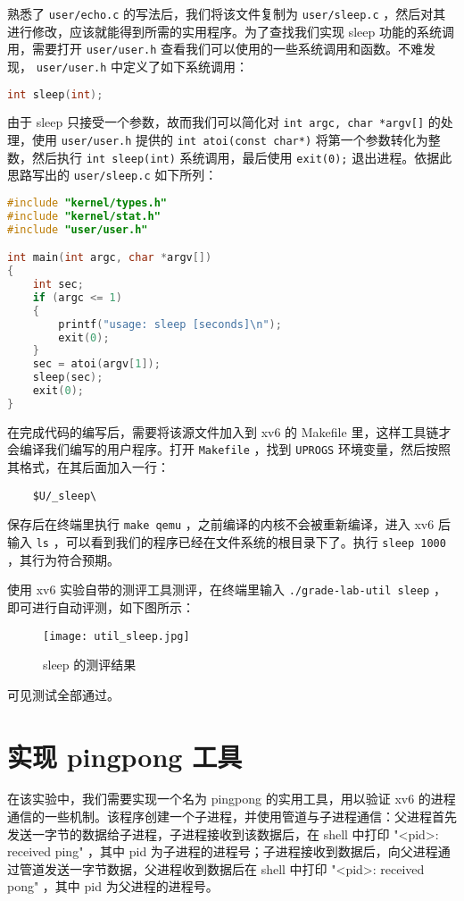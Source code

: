 熟悉了 \lstinline{user/echo.c} 的写法后，我们将该文件复制为 \lstinline{user/sleep.c} ，然后对其进行修改，应该就能得到所需的实用程序。为了查找我们实现 sleep 功能的系统调用，需要打开 \lstinline{user/user.h} 查看我们可以使用的一些系统调用和函数。不难发现， \lstinline{user/user.h} 中定义了如下系统调用：
\begin{lstlisting}[language=C]
  int sleep(int);
\end{lstlisting}
由于 sleep 只接受一个参数，故而我们可以简化对 \lstinline{int argc, char *argv[]} 的处理，使用 \lstinline{user/user.h} 提供的 \lstinline{int atoi(const char*)} 将第一个参数转化为整数，然后执行 \lstinline{int sleep(int)} 系统调用，最后使用 \lstinline{exit(0);} 退出进程。依据此思路写出的 \lstinline{user/sleep.c} 如下所列：
\begin{lstlisting}[language=C]
#include "kernel/types.h"
#include "kernel/stat.h"
#include "user/user.h"

int main(int argc, char *argv[])
{
    int sec;
    if (argc <= 1)
    {
        printf("usage: sleep [seconds]\n");
        exit(0);
    }
    sec = atoi(argv[1]);
    sleep(sec);
    exit(0);
}
\end{lstlisting}

在完成代码的编写后，需要将该源文件加入到 xv6 的 Makefile 里，这样工具链才会编译我们编写的用户程序。打开 \lstinline{Makefile} ，找到 \lstinline{UPROGS} 环境变量，然后按照其格式，在其后面加入一行：
\begin{lstlisting}
	$U/_sleep\
\end{lstlisting}
保存后在终端里执行 \lstinline{make qemu} ，之前编译的内核不会被重新编译，进入 xv6 后输入 \lstinline{ls} ，可以看到我们的程序已经在文件系统的根目录下了。执行 \lstinline{sleep 1000} ，其行为符合预期。

使用 xv6 实验自带的测评工具测评，在终端里输入 \lstinline{./grade-lab-util sleep} ，即可进行自动评测，如下图所示：
\begin{figure}[H]
  \centering
  \texttt{[image: util\_sleep.jpg]}
  \caption{ sleep 的测评结果}
\end{figure}
可见测试全部通过。

\section{实现 pingpong 工具}

在该实验中，我们需要实现一个名为 pingpong 的实用工具，用以验证 xv6 的进程通信的一些机制。该程序创建一个子进程，并使用管道与子进程通信：父进程首先发送一字节的数据给子进程，子进程接收到该数据后，在 shell 中打印 "<pid>: received ping" ，其中 pid 为子进程的进程号；子进程接收到数据后，向父进程通过管道发送一字节数据，父进程收到数据后在 shell 中打印 "<pid>: received pong" ，其中 pid 为父进程的进程号。

